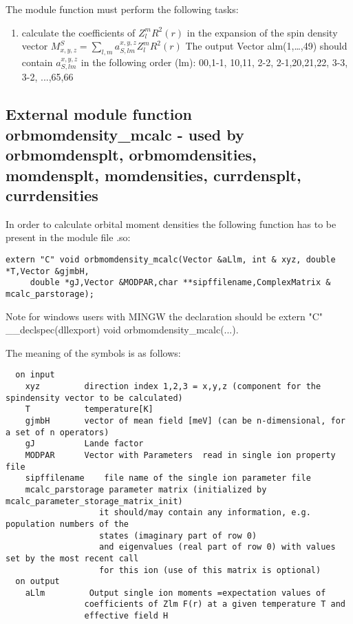 The module function must perform the following tasks:
\begin{enumerate}
\item calculate the coefficients of $Z_l^m R^2(r)$ in the expansion of
      the spin density vector $M^S_{x,y,z}=\sum_{l,m} a^{x,y,z}_{S,lm} Z_l^m R^2(r)$
      The output Vector alm(1,\dots,49) should contain  $a^{x,y,z}_{S,lm}$
      in the following order (lm):  00,1-1, 10,11, 2-2, 2-1,20,21,22, 3-3, 3-2, ...,65,66
\end{enumerate}

\subsection{External module function {\prg orbmomdensity\_mcalc} -
used by {\prg orbmomdensplt},
{\prg orbmomdensities},
{\prg momdensplt},
{\prg momdensities},
{\prg currdensplt},
{\prg currdensities}
}

In order to calculate orbital moment densities
the following function has to be
present in the module file {\prg *.so}:

\begin{verbatim}
extern "C" void orbmomdensity_mcalc(Vector &aLlm, int & xyz, double *T,Vector &gjmbH,
     double *gJ,Vector &MODPAR,char **sipffilename,ComplexMatrix & mcalc_parstorage);
\end{verbatim}

Note for windows users with MINGW the declaration should be {\prg extern "C" \_\_declspec(dllexport) void %
orbmomdensity\_mcalc(...)}.

The meaning of the symbols is as follows:
{\footnotesize
\begin{verbatim}
  on input
    xyz         direction index 1,2,3 = x,y,z (component for the spindensity vector to be calculated)
    T           temperature[K]
    gjmbH       vector of mean field [meV] (can be n-dimensional, for a set of n operators)
    gJ          Lande factor
    MODPAR      Vector with Parameters  read in single ion property file
    sipffilename    file name of the single ion parameter file
    mcalc_parstorage parameter matrix (initialized by mcalc_parameter_storage_matrix_init)
                   it should/may contain any information, e.g. population numbers of the
				   states (imaginary part of row 0)
                   and eigenvalues (real part of row 0) with values set by the most recent call
                   for this ion (use of this matrix is optional)
  on output
    aLlm         Output single ion moments =expectation values of
                coefficients of Zlm F(r) at a given temperature T and
                effective field H
\end{verbatim}
}

